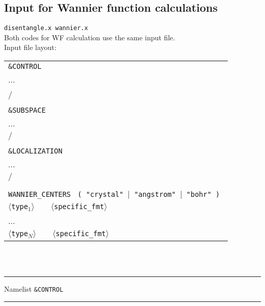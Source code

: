 \subsection{Input for Wannier function calculations}
 {\tt disentangle.x wannier.x}\\
\noindent Both codes for WF calculation use the same input file.\\

\noindent Input file layout: \\

%
%
\begin{tabular}{l}
{\tt \&CONTROL }\\
   ... \\
  / \\
  \\
{\tt \&SUBSPACE }\\
   ... \\
  $/$ \\
  \\
{\tt \&LOCALIZATION }\\
   ... \\
  $/$ \\
  \\
{\tt  WANNIER\_CENTERS } {\tt ( "crystal" $\mid$ "angstrom" $\mid$ "bohr" ) }\\
  $\langle${\tt type}$_1\rangle \qquad    \langle${\tt specific\_fmt}$\rangle$ \\
  ... \\
  $\langle${\tt type}$_N\rangle \qquad    \langle${\tt specific\_fmt}$\rangle$ 
\end{tabular}
%
%
\\
\\

\begin{centering}
\rule{2.2in}{0.01in} Namelist {\tt \&CONTROL } \rule{2.2in}{0.01in}
\end{centering}\\

